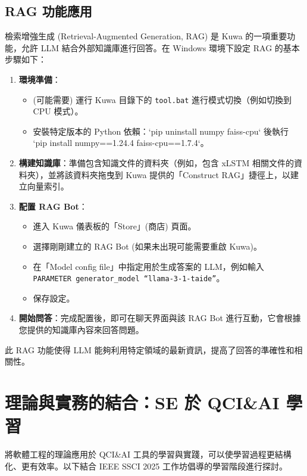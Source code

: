 \documentclass[twocolumn,11pt,a4paper]{article}
\begin{document}
\subsection{RAG 功能應用} %
檢索增強生成 (Retrieval-Augmented Generation, RAG) 是 Kuwa 的一項重要功能，允許 LLM 結合外部知識庫進行回答。在 Windows 環境下設定 RAG 的基本步驟如下：
\begin{enumerate}[noitemsep, topsep=0pt]
    \item \textbf{環境準備}：
        \begin{itemize}[noitemsep, topsep=0pt]
            \item (可能需要) 運行 Kuwa 目錄下的 \texttt{tool.bat} 進行模式切換（例如切換到 CPU 模式）。
            \item 安裝特定版本的 Python 依賴：`pip uninstall numpy faiss-cpu` 後執行 `pip install numpy==1.24.4 faiss-cpu==1.7.4`。
        \end{itemize}
    \item \textbf{構建知識庫}：準備包含知識文件的資料夾（例如，包含 xLSTM 相關文件的資料夾），並將該資料夾拖曳到 Kuwa 提供的「Construct RAG」捷徑上，以建立向量索引。
    \item \textbf{配置 RAG Bot}：
        \begin{itemize}[noitemsep, topsep=0pt]
            \item 進入 Kuwa 儀表板的「Store」(商店) 頁面。
            \item 選擇剛剛建立的 RAG Bot (如果未出現可能需要重啟 Kuwa)。
            \item 在「Model config file」中指定用於生成答案的 LLM，例如輸入 \texttt{PARAMETER generator\_model ``llama-3-1-taide''}。
            \item 保存設定。
        \end{itemize}
    \item \textbf{開始問答}：完成配置後，即可在聊天界面與該 RAG Bot 進行互動，它會根據您提供的知識庫內容來回答問題。
\end{enumerate}
此 RAG 功能使得 LLM 能夠利用特定領域的最新資訊，提高了回答的準確性和相關性。

\section{理論與實務的結合：SE 於 QCI\&AI 學習}
將軟體工程的理論應用於 QCI\&AI 工具的學習與實踐，可以使學習過程更結構化、更有效率。以下結合 IEEE SSCI 2025 工作坊倡導的學習階段進行探討。
\end{document}
